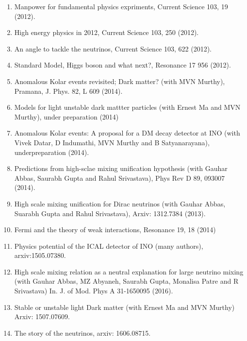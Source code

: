 \begin{enumerate}
\item Manpower for fundamental physics expriments, Current Science 103, 19 (2012).

\item High energy physics in 2012, Current Science 103, 250 (2012).

\item An angle to tackle the neutrinos, Current Science 103, 622 (2012).

\item Standard Model, Higgs boson and what next?, Resonance 17 956 (2012).

\item Anomalous Kolar events revisited; Dark matter? (with MVN Murthy), Pramana, J. Phys. 82, L 609 (2014).

\item Models for light unstable dark mattter particles (with Er\-nest Ma and MVN Murthy), under preparation (2014)

\item Anomalous Kolar events: A proposal for a DM decay detector at INO (with Vivek Datar, D Indumathi, MVN Murthy and B Satyanarayana), underpreparation (2014).

\item Predictions from high-sclae mixing unification hypothesis (with Gauhar Abbas, Saurabh Gupta and Rahul Srivastava), Phys Rev D 89, 093007 (2014).

\item High scale mixing unification for Dirac neutrinos (with Gau\-har Abbas, Suarabh Gupta and Rahul Srivastava), Arxiv: 1312.7384 (2013).

\item Fermi and the theory of weak interactions, Resonance 19, 18 (2014)

\item Physics potential of the ICAL detector of INO (many authors), arxiv:1505.07380.

\item High scale mixing relation as a neutral explanation for large neutrino mixing (with Gauhar Abbas, MZ Abyaneh, Saurabh Gupta, Monalisa Patre and R Srivastava) In. J. of Mod. Phys A 31-1650095 (2016).

\item Stable or unstable light Dark matter (with Ernest Ma and MVN Murthy) Arxiv: 1507.07609.

\item The story of the neutrinos, arxiv: 1606.08715.


\end{enumerate}
